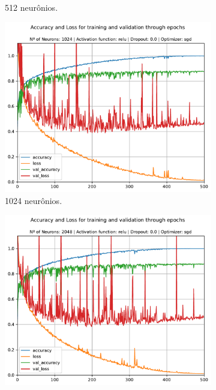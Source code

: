 \begin{figure}[H]
\begin{subfigure}[H]{0.49\textwidth}
		\caption{512 neurônios.}
		\label{fig:mlp_512_relu_0.0_sgd}
	\end{subfigure}
	\begin{subfigure}[H]{0.49\textwidth}
		\centering
		\includegraphics[width = \textwidth]{../../plot/mlp/mlp_1024_relu_0.0_sgd}
		\caption{1024 neurônios.}
		\label{fig:mlp_1024_relu_0.0_sgd}
	\end{subfigure}
	\begin{subfigure}[H]{0.49\textwidth}
		\centering
		\includegraphics[width = \textwidth]{../../plot/mlp/mlp_2048_relu_0.0_sgd}

\end{subfigure}
\end{figure}

